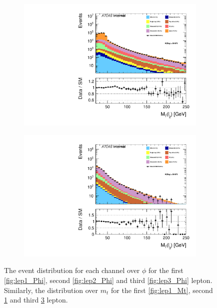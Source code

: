 \begin{figure}
{\begin{subfigure}{.425\textwidth}
        \includegraphics[width=\textwidth]{Figures/FeaturesHistograms/lep2_Mt.pdf}
        \caption{}
        \label{fig:lep2_Mt}
    \end{subfigure}
    \hfill
    \begin{subfigure}{.425\textwidth}
        \includegraphics[width=\textwidth]{Figures/FeaturesHistograms/lep3_Mt.pdf}
        \caption{}
        \label{fig:lep3_Mt}
    \end{subfigure}
    }
    \caption{The event distribution for each channel over $\phi$ for the first \ref{fig:lep1_Phi}, 
    second \ref{fig:lep2_Phi} and third \ref{fig:lep3_Phi} lepton. Similarly, the distribution over $m_t$
    for the first \ref{fig:lep1_Mt}, second \ref{fig:lep2_Mt} and third \ref{fig:lep3_Mt} lepton.}
\end{figure}
\newpage
